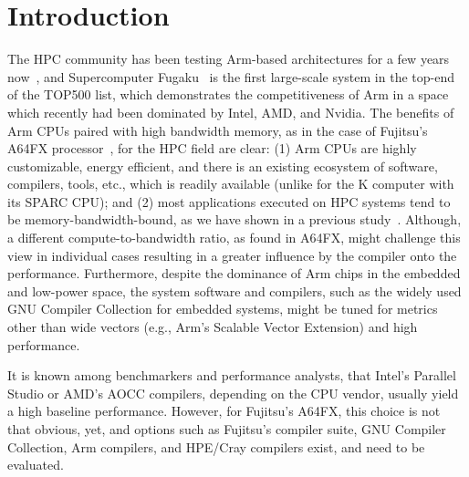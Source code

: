 \documentclass[conference,compsoc]{IEEEtran}
\begin{document}




%
\IEEEpeerreviewmaketitle



\section{Introduction}\label{sec:intro}
The HPC community has been testing Arm-based architectures for a few years
now~\cite{rajovic_supercomputing_2013,rajovic_mont-blanc_2016,rico_arm_2017}, and
Supercomputer Fugaku~\cite{sato_co-design_2020} is the first large-scale system in the top-end of the TOP500 list, which demonstrates the competitiveness
of Arm in
a space which recently had been dominated by Intel, AMD, and Nvidia. The benefits of Arm CPUs paired
with high bandwidth memory, as in the case of Fujitsu's A64FX processor~\cite{fujitsu_limited_fujitsu_nodate}, for the HPC field are clear:
(1) Arm CPUs are highly customizable, energy efficient, and there is an existing ecosystem of software,
compilers, tools, etc., which is readily available (unlike for the K computer with its SPARC CPU); and (2) most applications executed on HPC systems
tend to be memory-bandwidth-bound, as we have shown in a previous study~\cite{domke_double-precision_2019}.
Although, a different compute-to-bandwidth
ratio, as found in A64FX, might challenge this view in individual cases resulting in a greater influence
by the compiler onto the performance. Furthermore, despite the dominance of Arm chips in the embedded
and low-power space, the system software and compilers, such as the widely used GNU Compiler Collection
for embedded systems, might be tuned for metrics other than wide vectors (e.g., Arm's Scalable Vector
Extension) and high performance.

It is known among benchmarkers and performance analysts, that Intel’s Parallel Studio or AMD's AOCC compilers,
depending on the CPU vendor, usually yield a high baseline performance. However, for Fujitsu's A64FX, this
choice is not that obvious, yet, and options such as Fujitsu's compiler suite, GNU Compiler Collection,
Arm compilers, and HPE/Cray compilers exist, and need to be evaluated.
\end{document}
